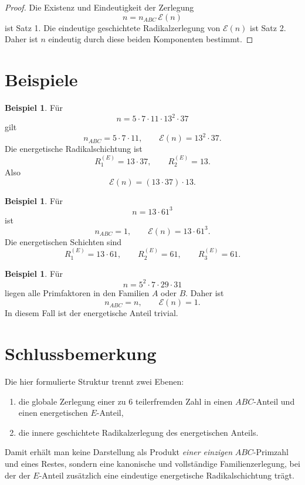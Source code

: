 \documentclass[11pt,a4paper]{article}
\theoremstyle{definition}
\newtheorem{beispiel}[satz]{Beispiel}
\theoremstyle{remark}
\begin{document}
	\begin{proof}
		Die Existenz und Eindeutigkeit der Zerlegung
		\[
		n=n_{ABC}\,\mathcal E(n)
		\]
		ist Satz 1. Die eindeutige geschichtete Radikalzerlegung von \(\mathcal E(n)\) ist Satz 2.
		Daher ist \(n\) eindeutig durch diese beiden Komponenten bestimmt.
	\end{proof}
	
	\section{Beispiele}
	
	\begin{beispiel}
		Für
		\[
		n=5\cdot 7\cdot 11\cdot 13^2\cdot 37
		\]
		gilt
		\[
		n_{ABC}=5\cdot 7\cdot 11,
		\qquad
		\mathcal E(n)=13^2\cdot 37.
		\]
		Die energetische Radikalschichtung ist
		\[
		R_1^{(E)}=13\cdot 37,
		\qquad
		R_2^{(E)}=13.
		\]
		Also
		\[
		\mathcal E(n)=(13\cdot 37)\cdot 13.
		\]
	\end{beispiel}
	
	\begin{beispiel}
		Für
		\[
		n=13\cdot 61^3
		\]
		ist
		\[
		n_{ABC}=1,
		\qquad
		\mathcal E(n)=13\cdot 61^3.
		\]
		Die energetischen Schichten sind
		\[
		R_1^{(E)}=13\cdot 61,\qquad
		R_2^{(E)}=61,\qquad
		R_3^{(E)}=61.
		\]
	\end{beispiel}
	
	\begin{beispiel}
		Für
		\[
		n=5^2\cdot 7\cdot 29\cdot 31
		\]
		liegen alle Primfaktoren in den Familien \(A\) oder \(B\). Daher ist
		\[
		n_{ABC}=n,
		\qquad
		\mathcal E(n)=1.
		\]
		In diesem Fall ist der energetische Anteil trivial.
	\end{beispiel}
	
	\section{Schlussbemerkung}
	
	Die hier formulierte Struktur trennt zwei Ebenen:
	
	\begin{enumerate}
		\item die globale Zerlegung einer zu \(6\) teilerfremden Zahl in einen \(ABC\)-Anteil und einen
		energetischen \(E\)-Anteil,
		\item die innere geschichtete Radikalzerlegung des energetischen Anteils.
	\end{enumerate}
	
	Damit erhält man keine Darstellung als Produkt \emph{einer einzigen} \(ABC\)-Primzahl und eines
	Restes, sondern eine kanonische und vollständige Familienzerlegung, bei der der \(E\)-Anteil
	zusätzlich eine eindeutige energetische Radikalschichtung trägt.
	
\end{document}
